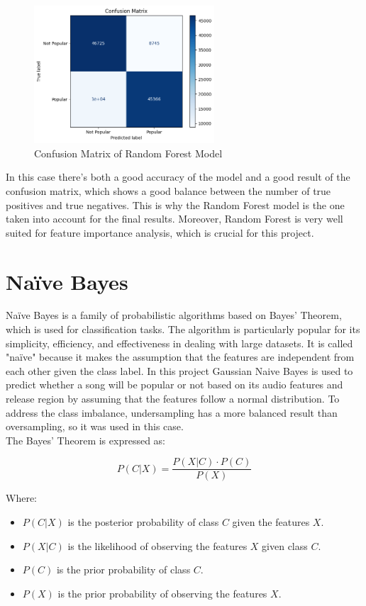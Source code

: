 \begin{figure}[h] 
    \centering 
    \includegraphics[width=0.6\textwidth]{media/random_forest_conf_matrix.png}
    \caption{Confusion Matrix of Random Forest Model}

\end{figure}

In this case there's both a good accuracy of the model and a good result of the confusion matrix, which shows a good balance between the number of true positives and true negatives. This is why the Random Forest model is the one taken into account for the final results. Moreover, Random Forest is very well suited for feature importance analysis, which is crucial for this project.

\section{Naïve Bayes}
Naïve Bayes is a family of probabilistic algorithms based on Bayes' Theorem, which is used for classification tasks.
The algorithm is particularly popular for its simplicity, efficiency, and effectiveness in dealing with large datasets.
It is called "naïve" because it makes the assumption that the features are independent from each other given the class label.
In this project Gaussian Naive Bayes is used to predict whether a song will be popular or not based on its audio features and release region by assuming that
the features follow a normal distribution. 
To address the class imbalance, undersampling has a more balanced result than oversampling, so it was used in this case.\\

The Bayes' Theorem is expressed as:

\[
P(C | X) = \frac{P(X | C) \cdot P(C)}{P(X)}
\]

Where:
\begin{itemize}
    \item \( P(C | X) \) is the posterior probability of class \( C \) given the features \( X \).
    \item \( P(X | C) \) is the likelihood of observing the features \( X \) given class \( C \).
    \item \( P(C) \) is the prior probability of class \( C \).
    \item \( P(X) \) is the prior probability of observing the features \( X \).
\end{itemize}

